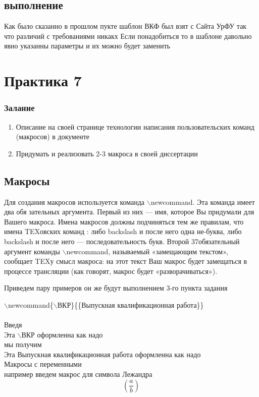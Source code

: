 \documentclass[a4paper,14pt,oneside]{book}
\theoremstyle{plain} %
\theoremstyle{definition} %
\theoremstyle{remark} %
\begin{document}
\section{выполнение}
Как было сказанно в прошлом пукте шаблон ВКФ был взят с Сайта УрФУ так что различий с требованиями никакх
Если понадобиться то в шаблоне давольно явно указанны параметры и их можно будет заменить

\chapter{Практика 7}
\subsection{Залание}
\begin{enumerate}
\item Описание на своей странице технологии написания пользовательских команд (макросов) в документе 
\item Придумать и реализовать 2-3 макроса в своей диссертации 
\end{enumerate}
\section{Макросы}
Для создания макросов используется команда $\backslash$newcommand. Эта команда имеет два обя
зательных аргумента. Первый из них — имя, которое Вы придумали для Вашего макроса.
Имена макросов должны подчиняться тем же правилам, что имена TEXовских команд : либо backslash и после него одна не-буква, либо backslash и после него — последовательность букв. Второй 37обязательный аргумент команды $\backslash$newcommand, называемый «замещающим текстом», сообщает TEXу смысл макроса: на этот текст Ваш макрос будет
замещаться в процессе трансляции (как говорят, макрос будет «разворачиваться»).

Приведем пару примеров он же будут выполнением 3-го пункта задания

$\backslash$newcommand\{$\backslash$ВКР\}\{\{Выпускная квалификационная работа\}\}\\

\newcommand{\ВКР}{{Выпускная квалификационная работа }}\\
Введя \\
Эта $\backslash$ВКР оформленна как надо\\
мы получим \\
Эта \ВКР   оформленна как надо\\
Макросы с переменными  \\
например введем макрос для символа Лежандра \[ \left(\frac{a}{b}\right) \]
\end{document}
